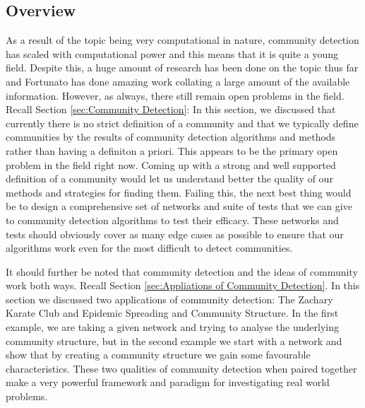 \subsection{Overview}
As a result of the topic being very computational in nature, community detection has scaled with computational power and this means that it is quite a young field. Despite this, a huge amount of research has been done on the topic thus far and Fortunato has done amazing work collating a large amount of the available information\cite{fortunato}. However, as always, there still remain open problems in the field. Recall Section \ref{sec:Community Detection}: In this section, we discussed that currently there is no strict definition of a community and that we typically define communities by the results of community detection algorithms and methods rather than having a definiton a priori. This appears to be the primary open problem in the field right now. Coming up with a strong and well supported definition of a community would let us understand better the quality of our methods and strategies for finding them. Failing this, the next best thing would be to design a comprehensive set of networks and suite of tests that we can give to community detection algorithms to test their efficacy. These networks and tests should obviously cover as many edge cases as possible to ensure that our algorithms work even for the most difficult to detect communities. 

It should further be noted that community detection and the ideas of community work both ways. Recall Section \ref{sec:Appliations of Community Detection}. In this section we discussed two applications of community detection: The Zachary Karate Club and Epidemic Spreading and Community Structure. In the first example, we are taking a given network and trying to analyse the underlying community structure, but in the second example we start with a network and show that by creating a community structure we gain some favourable characteristics. These two qualities of community detection when paired together make a very powerful framework and paradigm for investigating real world problems.


